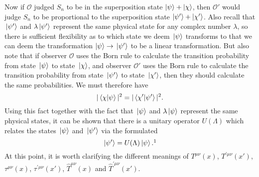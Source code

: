 Now if  $\mathcal{O}$ judged $S_n$ to be in the superposition state $\ket{\psi}+\ket{\chi}$, then $\mathcal{O}'$ would judge $S_n$ to be proportional to the superposition state $\ket{\psi'}+\ket{\chi'}$. Also recall that $\ket*{\psi'}$ and $\lambda\ket*{\psi'}$ represent the same physical state for any complex number $\lambda$, so there is sufficient flexibility as to which state we deem $\ket*{\psi}$ transforms to that we can deem the transformation $\ket{\psi}\rightarrow\ket*{\psi'}$ to be a linear transformation. But also note that if observer $\mathcal{O}$ uses the Born rule to calculate the transition probability from state $\ket*{\psi}$ to state $\ket*{\chi}$, and  observer $\mathcal{O}'$ uses the Born rule to calculate the transition probability from state $\ket*{\psi'}$ to state $\ket*{\chi'}$, then they should calculate the same probabilities. We must therefore have
$$|\ip*{\chi}{\psi}|^2=|\ip*{\chi'}{\psi'}|^2.$$
Using this fact together with the fact that $\ket*{\psi}$ and $\lambda\ket*{\psi}$ represent the same physical states, it can be shown that there is a unitary operator $U(\Lambda)$ %
%
 which relates the states $\ket*{\psi}$ and $\ket*{\psi'}$ via the formulated
$$\ket*{\psi'}=U(\Lambda)\ket*{\psi}.\protect\footnotemark$$At this point, it is worth clarifying the different meanings of $T^{\mu\nu}(x)$, $T^{\prime\mu\nu}(x')$, $\tau^{\mu\nu}(x)$, $\tau^{\prime\mu\nu}(x')$,  $\hat{T}^{\mu\nu}(x)$ and $\hat{T}^{\prime\mu\nu}(x')$. 
